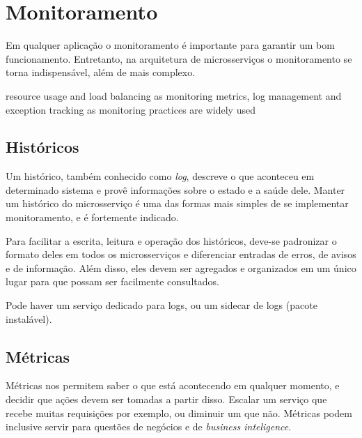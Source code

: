 
\section{Monitoramento}

Em qualquer aplicação o monitoramento é importante para garantir um bom funcionamento. Entretanto, na arquitetura de microsserviços o monitoramento se torna indispensável, além de mais complexo. %

resource usage and load balancing as monitoring metrics, log management and exception tracking as monitoring practices are widely used \cite{design-monitoring-testing-waseem}

\subsection{Históricos}

Um histórico, também conhecido como \emph{log}, descreve o que aconteceu em determinado sistema e provê informações sobre o estado e a saúde dele. Manter um histórico do microsserviço é uma das formas mais simples de se implementar monitoramento, e é fortemente indicado. 

Para facilitar a escrita, leitura e operação dos históricos, deve-se padronizar o formato deles em todos os microsserviços e diferenciar entradas de erros, de avisos e de informação. Além disso, eles devem ser agregados e organizados em um único lugar para que possam ser facilmente consultados.

Pode haver um serviço dedicado para logs, ou um sidecar de logs (pacote instalável).



\subsection{Métricas}
Métricas nos permitem saber o que está acontecendo em qualquer momento, e decidir que ações devem ser tomadas a partir disso. Escalar um serviço que recebe muitas requisições por exemplo, ou diminuir um que não. Métricas podem inclusive servir para questões de negócios e de \emph{business inteligence}. 

